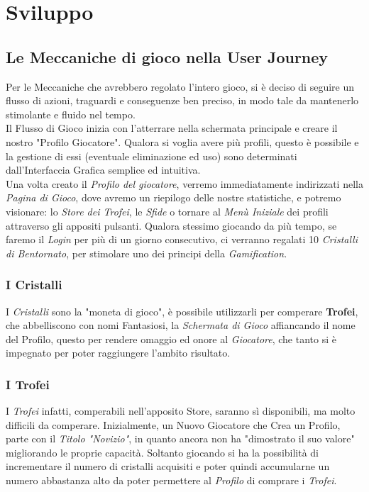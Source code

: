 \documentclass[14pt]{extbook}
\begin{document}
\pagebreak
\clearpage
\chapter{Sviluppo}
\section{Le Meccaniche di gioco nella User Journey}
Per le Meccaniche che avrebbero regolato l'intero gioco, si è deciso di seguire un flusso di azioni, traguardi e conseguenze ben preciso, in modo tale da mantenerlo stimolante e fluido nel tempo.\\

Il Flusso di Gioco inizia con l'atterrare nella schermata principale e creare il nostro "Profilo Giocatore". Qualora si voglia avere più profili, questo è possibile e la gestione di essi (eventuale eliminazione ed uso) sono determinati dall'Interfaccia Grafica semplice ed intuitiva.\\

Una volta creato il \textit{Profilo del giocatore}, verremo immediatamente indirizzati nella \textit{Pagina di Gioco}, dove avremo un riepilogo delle nostre statistiche, e potremo visionare: lo \textit{Store dei Trofei}, le \textit{Sfide} o tornare al \textit{Menù Iniziale} dei profili attraverso gli appositi pulsanti. Qualora stessimo giocando da più tempo, se faremo il \textit{Login} per più di un giorno consecutivo, ci verranno regalati 10 \textit{Cristalli di Bentornato}, per stimolare uno dei principi della \textit{Gamification}.\\

\subsection*{I Cristalli}
I \textit{Cristalli} sono la "moneta di gioco", è possibile utilizzarli per comperare \textbf{Trofei}, che abbelliscono con nomi Fantasiosi, la \textit{Schermata di Gioco} affiancando il nome del Profilo, questo per rendere omaggio ed onore al \textit{Giocatore}, che tanto si è impegnato per poter raggiungere l'ambito risultato.\\

\subsection{I Trofei}
I \textit{Trofei} infatti, comperabili nell'apposito Store, saranno sì disponibili, ma molto difficili da comperare. Inizialmente, un Nuovo Giocatore che Crea un Profilo, parte con il \textit{Titolo "Novizio"}, in quanto ancora non ha "dimostrato il suo valore" migliorando le proprie capacità. Soltanto giocando si ha la possibilità di incrementare il numero di cristalli acquisiti e poter quindi accumularne un numero abbastanza alto da poter permettere al \textit{Profilo} di comprare i \textit{Trofei}.\\
\end{document}
